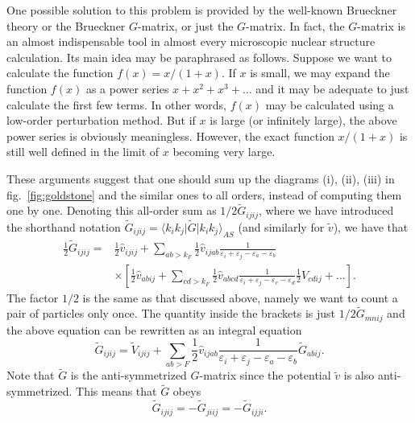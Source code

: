 One possible solution to  this problem is provided by the well-known
Brueckner theory or the Brueckner $G$-matrix, or just the
$G$-matrix. In fact, the $G$-matrix is an almost indispensable
tool in almost every microscopic nuclear structure
calculation. Its main idea may be paraphrased as follows.
Suppose we want to calculate the function $f(x)=x/(1+x)$. If
$x$ is small, we may expand the function $f(x)$ as a power series
$x+x^2+x^3+\dots$ and it may be adequate to just calculate the first
few terms. In other words, $f(x)$ may be calculated using a low-order
perturbation method. But if $x$ is large
(or infinitely large), the above
power series is obviously meaningless.
However, the exact function
$x/(1+x)$ is still well defined in the limit
of $x$ becoming very large.

These arguments suggest that one should sum up the diagrams
(i), (ii), (iii) in fig.~\ref{fig:goldstone} and the similar ones
to all orders, instead of computing them one by one. Denoting this
all-order sum as $1/2\tilde{G}_{ijij}$, where we have
introduced the shorthand notation
$\tilde{G}_{ijij}=\langle k_ik_j\vert \tilde{G}\vert k_ik_j\rangle_{AS}$
(and similarly for $\tilde{v}$),
we have that
\begin{align}
      \frac{1}{2}\tilde{G}_{ijij}=&\frac{1}{2}\hat{v}_{ijij}
      +\sum_{ab>k_F}\frac{1}{2}\hat{v}_{ijab}\frac{1}{\varepsilon_i+\varepsilon_j-\varepsilon_a-\varepsilon_b}
      \nonumber \\
      & \times\left[\frac{1}{2}\hat{v}_{abij}+\sum_{cd>k_F}
      \frac{1}{2}\hat{v}_{abcd}\frac{1}
      {\varepsilon_i+\varepsilon_j-\varepsilon_c-\varepsilon_d}
      \frac{1}{2}V_{cdij}+\dots  \right].
\end{align}
The factor $1/2$ is the same as that discussed above, namely we want 
to count a pair of particles only once.
The quantity inside the brackets is just
$1/2\tilde{G}_{mnij}$ and the above equation can be
rewritten as an integral equation
\begin{equation}
      \tilde{G}_{ijij}=\tilde{V}_{ijij}
      +\sum_{ab>F}\frac{1}{2}\hat{v}_{ijab}\frac{1}{\varepsilon_i+\varepsilon_j-\varepsilon_a-\varepsilon_b}
      \tilde{G}_{abij}.
\end{equation}
Note that $\tilde{G}$ is the anti-symmetrized $G$-matrix since
the potential $\tilde{v}$ is also anti-symmetrized. This means that
$\tilde{G}$ obeys
\begin{equation}
  \tilde{G}_{ijij}=-\tilde{G}_{jiij}=-\tilde{G}_{ijji}.
\end{equation}
